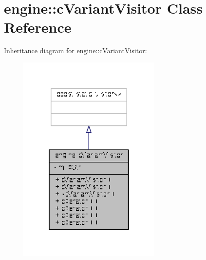 \hypertarget{classengine_1_1cVariantVisitor}{\section{engine\-:\-:c\-Variant\-Visitor Class Reference}
\label{classengine_1_1cVariantVisitor}
}


Inheritance diagram for engine\-:\-:c\-Variant\-Visitor\-:
\nopagebreak
\begin{figure}[H]
\begin{center}
\leavevmode
\includegraphics[width=202pt]{classengine_1_1cVariantVisitor__inherit__graph}
\end{center}
\end{figure}



